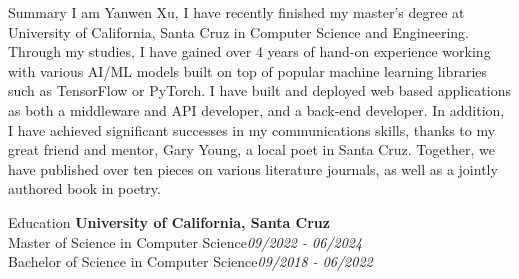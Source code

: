 \documentclass{resume} %
\begin{document}
\nobibliography*
\begin{rSection}{Summary}
I am Yanwen Xu, I have recently finished my master's degree at University of California, Santa Cruz in Computer Science and Engineering. Through my studies, I have gained over 4 years of hand-on experience working with various AI/ML models built on top of popular machine learning libraries such as TensorFlow or PyTorch. I have built and deployed web based applications as both a middleware and API developer, and a back-end developer. In addition, I have achieved significant successes in my communications skills, thanks to my great friend and mentor, Gary Young, a local poet in Santa Cruz. Together, we have published over ten pieces on various literature journals, as well as a jointly authored book in poetry. 
\end{rSection}
\vspace{-0.2cm}
\begin{rSection}{Education}
{\bf University of California, Santa Cruz}\\
Master of Science in Computer Science\hfill {\em 09/2022 - 06/2024}
\\ Bachelor of Science in Computer Science\hfill {\em 09/2018 - 06/2022}  
\end{rSection}
\vspace{-0.2cm}
\end{document}
